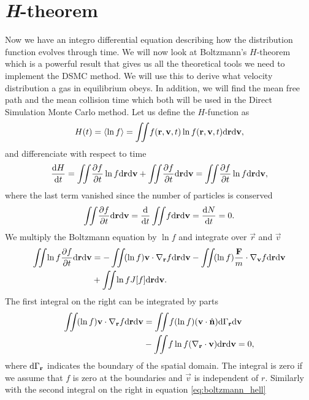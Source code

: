 \section{\textit{H}-theorem}
Now we have an integro differential equation describing how the distribution function evolves through time. We will now look at Boltzmann's $H$-theorem which is a powerful result that gives us all the theoretical tools we need to implement the DSMC method. We will use this to derive what velocity distribution a gas in equilibrium obeys. In addition, we will find the mean free path and the mean collision time which both will be used in the Direct Simulation Monte Carlo method. Let us define the $H$-function as
\begin{align}
	\label{eq:h_function}
	H(t) = \langle \ln f \rangle = \iint\! f(\mathbf r, \mathbf v, t)\ln f(\mathbf r, \mathbf v, t)\mathrm{d}\mathbf r \mathrm{d}\mathbf v,
\end{align}
and differenciate with respect to time
\begin{align}
	\label{eq:h_theorem_one}
	\frac{\mathrm{d}H}{\mathrm{d}t} = \iint\! \frac{\partial f}{\partial t}\ln f \mathrm{d}\mathbf r \mathrm{d}\mathbf v + \iint\! \frac{\partial f}{\partial t} \mathrm{d}\mathbf r \mathrm{d}\mathbf v = \iint\! \frac{\partial f}{\partial t}\ln f \mathrm{d}\mathbf r \mathrm{d}\mathbf v,
\end{align}
where the last term vanished since the number of particles is conserved
\begin{align}
	\iint\! \dpart{f}{t}\dm\vec r \dm\vec v = \frac{\dm}{\dm t} \iint\! f\dm\vec r \dm\vec v = \frac{\dm N}{\dm t} = 0.
\end{align}
We multiply the Boltzmann equation by $\ln f$ and integrate over $\vec r$ and $\vec v$
\begin{align}
	\nonumber
	\iint\! \ln f\frac{\partial f}{\partial t} \mathrm{d}\mathbf r \mathrm{d}\mathbf v &= -\iint\! (\ln f)\mathbf v\cdot \nabla_\mathbf r f \mathrm{d}\mathbf r \mathrm{d}\mathbf v - \iint\! (\ln f) \frac{\mathbf F}{m}\cdot \nabla_\mathbf v f \mathrm{d}\mathbf r\mathrm{d}\mathbf v\\
	\label{eq:boltzmann_hell}
	&+ \iint\! \ln f J[f] \mathrm{d}\mathbf r \mathrm{d}\mathbf v.
\end{align}
The first integral on the right can be integrated by parts
\begin{align}
	\nonumber
	\iint\! (\ln f)\mathbf v\cdot \nabla_\mathbf r f \mathrm{d}\mathbf r \mathrm{d}\mathbf v &= \iint\! f(\ln f) (\mathbf v\cdot \hat{\mathbf n})\mathrm{d}\Gamma_\mathbf r\mathrm{d}\mathbf v\\
	&- \iint\! f\ln f(\nabla_\mathbf r \cdot \mathbf v)\mathrm{d}\mathbf r\mathrm{d}\mathbf v = 0,
\end{align}
where $\mathrm{d}\Gamma_\mathbf r$ indicates the boundary of the spatial domain. The integral is zero if we assume that $f$ is zero at the boundaries and $\vec v$ is independent of $r$. Similarly with the second integral on the right in equation \eqref{eq:boltzmann_hell}
